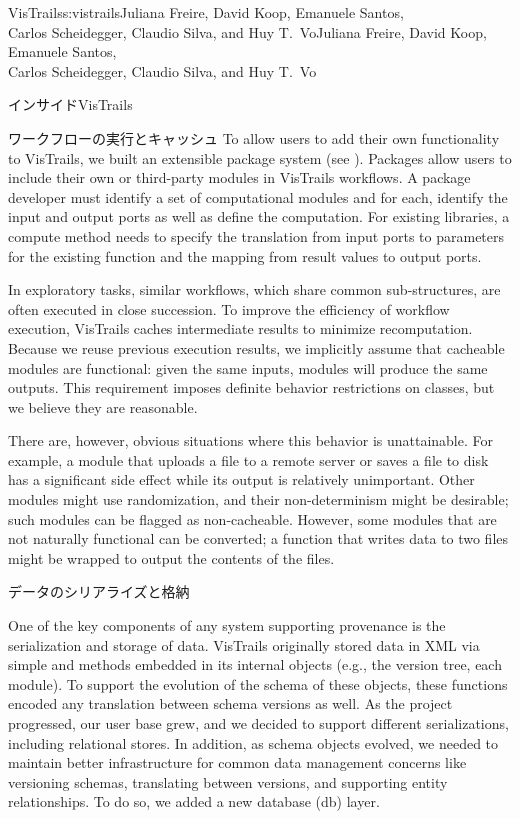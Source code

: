 \begin{aosachaptertoc}{VisTrails}{s:vistrails}{Juliana Freire, David Koop, Emanuele Santos, \\ Carlos Scheidegger, Claudio Silva, and Huy T.\ Vo}{Juliana Freire, David Koop, Emanuele Santos, \\ \hspace*{0.9cm} Carlos Scheidegger, Claudio Silva, and Huy T.\ Vo}
\begin{aosasect1}{インサイドVisTrails}
\begin{aosasect2}{ワークフローの実行とキャッシュ}
To allow users to add their own functionality to VisTrails, we built
an extensible package system (see
).  Packages allow users to include
their own or third-party modules in VisTrails workflows.  A package
developer must identify a set of computational modules and for each,
identify the input and output ports as well as define the computation.
For existing libraries, a compute method needs to specify the
translation from input ports to parameters for the existing function
and the mapping from result values to output ports.

In exploratory tasks, similar workflows, which share common
sub-structures, are often executed in close succession. To improve the
efficiency of workflow execution, VisTrails caches intermediate
results to minimize recomputation.  Because we reuse previous
execution results, we implicitly assume that cacheable modules are
functional: given the same inputs, modules will produce the same
outputs. This requirement imposes definite behavior restrictions on
classes, but we believe they are reasonable. 

There are, however, obvious situations where this behavior
is unattainable.  For example, a module that uploads a file to a
remote server or saves a file to disk has a significant side effect
while its output is relatively unimportant.  Other modules might use
randomization, and their non-determinism might be desirable; such
modules can be flagged as non-cacheable. However, some modules that
are not naturally functional can be converted; a function that writes
data to two files might be wrapped to output the contents of the
files.

\end{aosasect2}

\begin{aosasect2}{データのシリアライズと格納}

One of the key components of any system supporting provenance is the
serialization and storage of data.  VisTrails originally stored data
in XML via simple  and  methods embedded in
its internal objects (e.g., the version tree, each module).  To
support the evolution of the schema of these objects, these functions
encoded any translation between schema versions as well.  As the
project progressed, our user base grew, and we decided to support
different serializations, including relational stores.  In
addition, as schema objects evolved, we needed to maintain better
infrastructure for common data management concerns like versioning
schemas, translating between versions, and supporting entity
relationships.  To do so, we added a new database (db) layer.


\end{aosasect2}
\end{aosasect1}
\end{aosachaptertoc}
